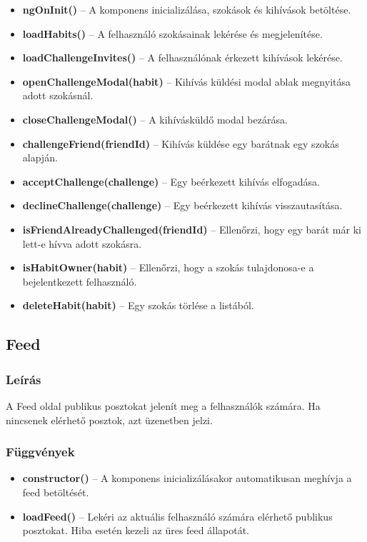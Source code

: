 \documentclass[12pt]{report}
\begin{document}
\begin{itemize}
  \item \textbf{ngOnInit()} -- A komponens inicializálása, szokások és kihívások betöltése.
  \item \textbf{loadHabits()} -- A felhasználó szokásainak lekérése és megjelenítése.
  \item \textbf{loadChallengeInvites()} -- A felhasználónak érkezett kihívások lekérése.
  \item \textbf{openChallengeModal(habit)} -- Kihívás küldési modal ablak megnyitása adott szokásnál.
  \item \textbf{closeChallengeModal()} -- A kihívásküldő modal bezárása.
  \item \textbf{challengeFriend(friendId)} -- Kihívás küldése egy barátnak egy szokás alapján.
  \item \textbf{acceptChallenge(challenge)} -- Egy beérkezett kihívás elfogadása.
  \item \textbf{declineChallenge(challenge)} -- Egy beérkezett kihívás visszautasítása.
  \item \textbf{isFriendAlreadyChallenged(friendId)} -- Ellenőrzi, hogy egy barát már ki lett-e hívva adott szokásra.
  \item \textbf{isHabitOwner(habit)} -- Ellenőrzi, hogy a szokás tulajdonosa-e a bejelentkezett felhasználó.
  \item \textbf{deleteHabit(habit)} -- Egy szokás törlése a listából.
\end{itemize}

\subsection{Feed}

\subsubsection{Leírás}
A Feed oldal publikus posztokat jelenít meg a felhasználók számára. Ha nincsenek elérhető posztok, azt üzenetben jelzi.

\subsubsection{Függvények}

\begin{itemize}
  \item \textbf{constructor()} -- A komponens inicializálásakor automatikusan meghívja a feed betöltését.
  \item \textbf{loadFeed()} -- Lekéri az aktuális felhasználó számára elérhető publikus posztokat. Hiba esetén kezeli az üres feed állapotát.
\end{itemize}
\end{document}
